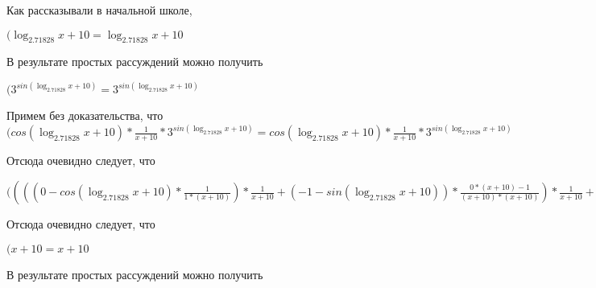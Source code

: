 \documentclass[12pt,a4paper,fleqn]{article}
\theoremstyle{definition}
\begin{document}
Как рассказывали в начальной школе,

$(\log_{ 2.71828 }{ x  +  10 } = \log_{ 2.71828 }{ x  +  10 }$

В результате простых рассуждений можно получить

$({ 3 }^{sin(\log_{ 2.71828 }{ x  +  10 })} = { 3 }^{sin(\log_{ 2.71828 }{ x  +  10 })}$

Примем без доказательства, что
$(cos(\log_{ 2.71828 }{ x  +  10 }) * \frac{ 1 }{ x  +  10 }
 * { 3 }^{sin(\log_{ 2.71828 }{ x  +  10 })} = cos(\log_{ 2.71828 }{ x  +  10 }) * \frac{ 1 }{ x  +  10 }
 * { 3 }^{sin(\log_{ 2.71828 }{ x  +  10 })}$

Отсюда очевидно следует, что

$(((( 0  - cos(\log_{ 2.71828 }{ x  +  10 }) * \frac{ 1 }{ 1  * ( x  +  10 )}
) * \frac{ 1 }{ x  +  10 }
 + ( -1  - sin(\log_{ 2.71828 }{ x  +  10 })) * \frac{ 0  * ( x  +  10 ) -  1 }{( x  +  10 ) * ( x  +  10 )}
) * \frac{ 1 }{ x  +  10 }
 + ( -1  - sin(\log_{ 2.71828 }{ x  +  10 })) * \frac{ 1 }{ x  +  10 }
 * \frac{ 0  * ( x  +  10 ) -  1 }{( x  +  10 ) * ( x  +  10 )}
 + ( -1  - sin(\log_{ 2.71828 }{ x  +  10 })) * \frac{ 1 }{ 1  * ( x  +  10 )}
 * \frac{ -2 }{( x  +  10 ) * ( x  +  10 )}
 + cos(\log_{ 2.71828 }{ x  +  10 }) * \frac{ 0  * ( x  +  10 ) * ( x  +  10 ) -  -2  * ( 1  * ( x  +  10 ) + ( x  +  10 ) *  1 )}{( x  +  10 ) * ( x  +  10 ) * ( x  +  10 ) * ( x  +  10 )}
) * cos(\log_{ 2.71828 }{ x  +  10 }) * \frac{ 1 }{ x  +  10 }
 * { 3 }^{sin(\log_{ 2.71828 }{ x  +  10 })} = ((( 0  - cos(\log_{ 2.71828 }{ x  +  10 }) * \frac{ 1 }{ 1  * ( x  +  10 )}
) * \frac{ 1 }{ x  +  10 }
 + ( -1  - sin(\log_{ 2.71828 }{ x  +  10 })) * \frac{ 0  * ( x  +  10 ) -  1 }{( x  +  10 ) * ( x  +  10 )}
) * \frac{ 1 }{ x  +  10 }
 + ( -1  - sin(\log_{ 2.71828 }{ x  +  10 })) * \frac{ 1 }{ x  +  10 }
 * \frac{ 0  * ( x  +  10 ) -  1 }{( x  +  10 ) * ( x  +  10 )}
 + ( -1  - sin(\log_{ 2.71828 }{ x  +  10 })) * \frac{ 1 }{ 1  * ( x  +  10 )}
 * \frac{ -2 }{( x  +  10 ) * ( x  +  10 )}
 + cos(\log_{ 2.71828 }{ x  +  10 }) * \frac{ 0  * ( x  +  10 ) * ( x  +  10 ) -  -2  * ( 1  * ( x  +  10 ) + ( x  +  10 ) *  1 )}{( x  +  10 ) * ( x  +  10 ) * ( x  +  10 ) * ( x  +  10 )}
) * cos(\log_{ 2.71828 }{ x  +  10 }) * \frac{ 1 }{ x  +  10 }
 * { 3 }^{sin(\log_{ 2.71828 }{ x  +  10 })}$

Отсюда очевидно следует, что

$( x  +  10  =  x  +  10 $

В результате простых рассуждений можно получить
\end{document}
